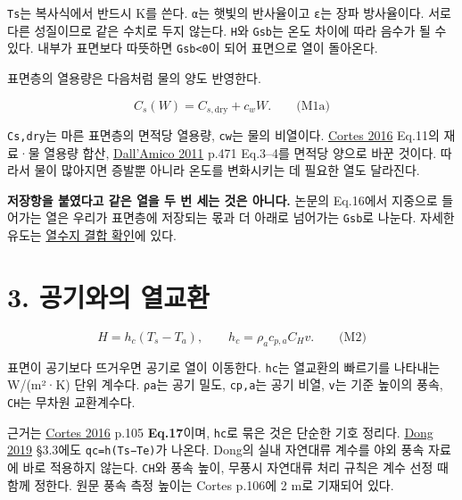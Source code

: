 \documentclass[11pt,a4paper]{article}
\begin{document}
\texttt{Ts}는 복사식에서 반드시 K를 쓴다. \texttt{α}는 햇빛의 반사율이고 \texttt{ε}는 장파 방사율이다. 서로 다른 성질이므로 같은 수치로 두지 않는다. \texttt{H}와 \texttt{Gsb}는 온도 차이에 따라 음수가 될 수 있다. 내부가 표면보다 따뜻하면 \texttt{Gsb<0}이 되어 표면으로 열이 돌아온다.

표면층의 열용량은 다음처럼 물의 양도 반영한다.

\begin{equation*}
C_s(W)=C_{s,\mathrm{dry}}+c_w W.\qquad\text{(M1a)}
\end{equation*}

\texttt{Cs,dry}는 마른 표면층의 면적당 열용량, \texttt{cw}는 물의 비열이다. \href{\detokenize{https://www.jstage.jst.go.jp/article/taiki/51/2/51_103/_pdf/-char/en}}{Cortes 2016} Eq.11의 재료·물 열용량 합산, \href{\detokenize{https://tc.copernicus.org/articles/5/469/2011/tc-5-469-2011.pdf}}{Dall'Amico 2011} p.471 Eq.3–4를 면적당 양으로 바꾼 것이다. 따라서 물이 많아지면 증발뿐 아니라 온도를 변화시키는 데 필요한 열도 달라진다.

\textbf{저장항을 붙였다고 같은 열을 두 번 세는 것은 아니다.} 논문의 Eq.16에서 지중으로 들어가는 열은 우리가 표면층에 저장되는 몫과 더 아래로 넘어가는 \texttt{Gsb}로 나눈다. 자세한 유도는 \href{\detokenize{equation-derivation.md}}{열수지 결합 확인}에 있다.

\section{3. 공기와의 열교환}

\begin{equation*}
H=h_c(T_s-T_a),\qquad h_c=\rho_a c_{p,a}C_H v.\qquad\text{(M2)}
\end{equation*}

표면이 공기보다 뜨거우면 공기로 열이 이동한다. \texttt{hc}는 열교환의 빠르기를 나타내는 W/(m²·K) 단위 계수다. \texttt{ρa}는 공기 밀도, \texttt{cp,a}는 공기 비열, \texttt{v}는 기준 높이의 풍속, \texttt{CH}는 무차원 교환계수다.

근거는 \href{\detokenize{https://www.jstage.jst.go.jp/article/taiki/51/2/51_103/_pdf/-char/en}}{Cortes 2016} p.105 \textbf{Eq.17}이며, \texttt{hc}로 묶은 것은 단순한 기호 정리다. \href{\detokenize{https://mdpi-res.com/d_attachment/materials/materials-12-02546/article_deploy/materials-12-02546.pdf}}{Dong 2019} §3.3에도 \texttt{qc=h(Ts−Te)}가 나온다. Dong의 실내 자연대류 계수를 야외 풍속 자료에 바로 적용하지 않는다. \texttt{CH}와 풍속 높이, 무풍시 자연대류 처리 규칙은 계수 선정 때 함께 정한다. 원문 풍속 측정 높이는 Cortes p.106에 2 m로 기재되어 있다.
\end{document}
